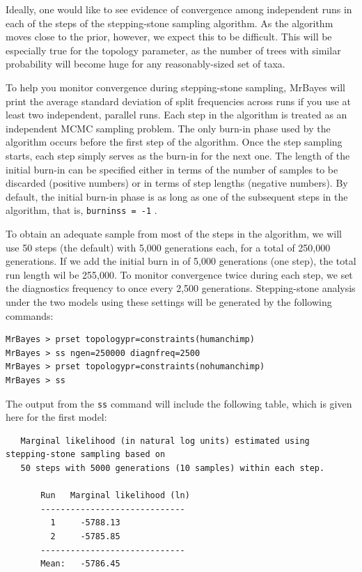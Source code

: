 \documentclass[12pt]{book}
\newcommand{\ttt}[1]{\texttt{#1} }
\begin{document}
Ideally, one would like to see evidence of convergence among independent runs in each of the steps of the
stepping-stone sampling algorithm. As the algorithm moves close to the prior, however, we expect this to
be difficult. This will be especially true for the topology parameter, as the number of trees with similar probability
will become huge for any reasonably-sized set of taxa.

To help you monitor convergence during stepping-stone sampling, MrBayes will print the average standard
deviation of split frequencies across runs if you use at least two independent, parallel runs. Each step in the
algorithm is treated as an independent MCMC sampling problem. The only burn-in phase used by the algorithm
occurs before the first step of the algorithm. Once the step sampling starts, each step simply serves as the burn-in
for the next one. The length of the initial burn-in can be specified either in terms of the number of samples to be
discarded (positive numbers) or in terms of step lengths (negative numbers). By default, the initial burn-in phase
is as long as one of the subsequent steps in the algorithm, that is, \ttt{burninss = -1}.

To obtain an adequate sample from most of the steps in the algorithm, we will use 50 steps (the default) with
5,000 generations each, for a total of 250,000 generations. If we add the initial burn in of 5,000 generations
(one step), the total run length wil be 255,000. To monitor convergence twice during each step,
we set the diagnostics frequency to once every 2,500 generations. Stepping-stone analysis under the two
models using these settings will be generated by the following commands:

\begin{singlespacing}
\begin{verbatim}
MrBayes > prset topologypr=constraints(humanchimp)
MrBayes > ss ngen=250000 diagnfreq=2500
MrBayes > prset topologypr=constraints(nohumanchimp)
MrBayes > ss
\end{verbatim}
\end{singlespacing}

The output from the \ttt{ss} command will include the following table, which is given here for the first model:

\scriptsize
\begin{singlespacing}
\begin{verbatim}
   Marginal likelihood (in natural log units) estimated using stepping-stone sampling based on
   50 steps with 5000 generations (10 samples) within each step. 

       Run   Marginal likelihood (ln)
       -----------------------------
         1     -5788.13   
         2     -5785.85   
       -----------------------------
       Mean:   -5786.45
\end{verbatim}
\end{singlespacing}
\normalsize
\end{document}
